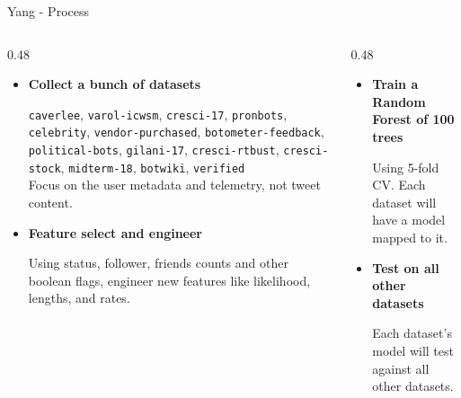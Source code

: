 \documentclass[aspectratio=169, 10pt]{beamer}
\begin{document}
\begin{frame}{Yang - Process}
  \begin{columns}[T]
    \begin{column}{0.48\textwidth}
      \begin{itemize}
        \item \textbf{Collect a bunch of datasets}
          \begin{indentedblock}
            \tiny \texttt{caverlee}, \texttt{varol-icwsm}, \texttt{cresci-17}, \texttt{pronbots}, \texttt{celebrity}, \texttt{vendor-purchased}, \texttt{botometer-feedback}, \texttt{political-bots}, \texttt{gilani-17}, \texttt{cresci-rtbust}, \texttt{cresci-stock}, \texttt{midterm-18}, \texttt{botwiki}, \texttt{verified}\\
            \vspace{0.1cm}
            \scriptsize Focus on the user metadata and telemetry, not tweet content.
          \end{indentedblock}

        \item \textbf{Feature select and engineer}
          \begin{indentedblock}
            \scriptsize Using status, follower, friends counts and other boolean flags, engineer new features like likelihood, lengths, and rates.
          \end{indentedblock}
      \end{itemize}
    \end{column}

    \begin{column}{0.48\textwidth}
      \begin{itemize}
        \item \textbf{Train a Random Forest of 100 trees}
          \begin{indentedblock}
            \scriptsize Using 5-fold CV.
            \vspace{0.1cm}
            \scriptsize Each dataset will have a model mapped to it.
          \end{indentedblock}

        \item \textbf{Test on all other datasets}
          \begin{indentedblock}
            \scriptsize Each dataset's model will test against all other datasets.
          \end{indentedblock}
      \end{itemize}
    \end{column}
  \end{columns}
\end{frame}
\end{document}
